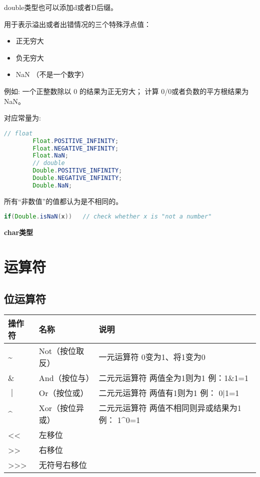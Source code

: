 double类型也可以添加d或者D后缀。


用于表示溢出或者出错情况的三个特殊浮点值：

\begin{itemize}
        \item   正无穷大  
        \item   负无穷大
        \item   NaN （不是一个数字）
\end{itemize}

例如: 一个正整数除以 0 的结果为正无穷大； 计算 0/0或者负数的平方根结果为NaN。

对应常量为:
\begin{lstlisting}[language=java]
        // float
        Float.POSITIVE_INFINITY;
        Float.NEGATIVE_INFINITY;
        Float.NaN;
        // double
        Double.POSITIVE_INFINITY;
        Double.NEGATIVE_INFINITY;
        Double.NaN;
\end{lstlisting}


所有“非数值”的值都认为是不相同的。

\begin{lstlisting}[language=java]
        if(Double.isNaN(x))   // check whether x is "not a number"
\end{lstlisting}




\textbf{char类型}


\section{运算符}

\subsection{位运算符}

\renewcommand\arraystretch{2}
\begin{tabular}{l|l|l}
    操作符    &     名称          &     说明                                            \\   \hline
    \~{}     &  Not（按位取反）   & 一元运算符 \quad 0变为1、将1变为0                       \\
    \&       &   And（按位与）    & 二元元运算符 \quad 两值全为1则为1 \quad 例：1\&1=1       \\
    ｜       &   Or（按位或）     & 二元元运算符 \quad 两值有1则为1 \quad 例： 0|1=1         \\
    \^{}     &   Xor（按位异或）  & 二元元运算符 \quad 两值不相同则异或结果为1 \quad 例： 1\^{}0=1   \\
    <<       &  左移位           &                \\
    >>       &  右移位           &                \\ 
    >>>      & 无符号右移位       &                 \\
\end{tabular}\newline


